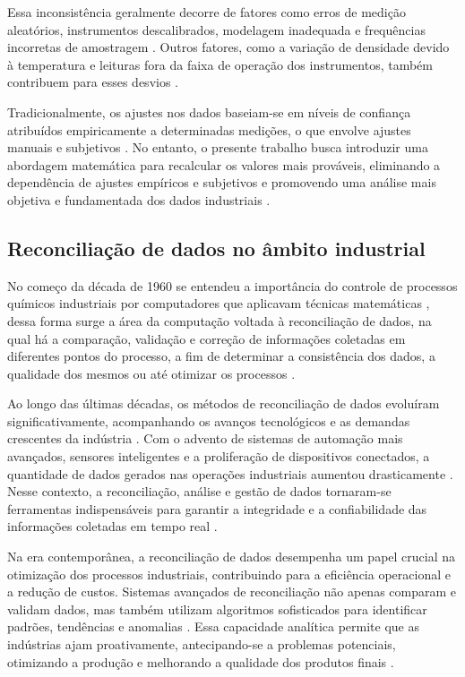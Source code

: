 Essa inconsistência geralmente decorre de fatores como erros de medição aleatórios, instrumentos descalibrados, modelagem inadequada e frequências incorretas de amostragem \cite{measurementerror2020}. Outros fatores, como a variação de densidade devido à temperatura e leituras fora da faixa de operação dos instrumentos, também contribuem para esses desvios \cite{temperaturedensity2022}.

Tradicionalmente, os ajustes nos dados baseiam-se em níveis de confiança atribuídos empiricamente a determinadas medições, o que envolve ajustes manuais e subjetivos \cite{empiricaladjustment2023}. No entanto, o presente trabalho busca introduzir uma abordagem matemática para recalcular os valores mais prováveis, eliminando a dependência de ajustes empíricos e subjetivos e promovendo uma análise mais objetiva e fundamentada dos dados industriais \cite{mathematicalapproach2024}.


\subsection{Reconciliação de dados no âmbito industrial}
    
No começo da década de 1960 se entendeu a importância do controle de processos químicos industriais por computadores que aplicavam técnicas matemáticas \cite{computecontrol}, dessa forma surge a área da computação voltada à reconciliação de dados, na qual há a comparação, validação e correção de informações coletadas em diferentes pontos do processo, a fim de determinar a consistência dos dados, a qualidade dos mesmos ou até otimizar os processos \cite{datarecshakar}.
    
Ao longo das últimas décadas, os métodos de reconciliação de dados evoluíram significativamente, acompanhando os avanços tecnológicos e as demandas crescentes da indústria \cite{datarecsurvey}. Com o advento de sistemas de automação mais avançados, sensores inteligentes e a proliferação de dispositivos conectados, a quantidade de dados gerados nas operações industriais aumentou drasticamente \cite{datarecsurvey}. Nesse contexto, a reconciliação, análise e gestão de dados tornaram-se ferramentas indispensáveis para garantir a integridade e a confiabilidade das informações coletadas em tempo real \cite{aularecon}.
    
Na era contemporânea, a reconciliação de dados desempenha um papel crucial na otimização dos processos industriais, contribuindo para a eficiência operacional e a redução de custos. Sistemas avançados de reconciliação não apenas comparam e validam dados, mas também utilizam algoritmos sofisticados para identificar padrões, tendências e anomalias \cite{datarecragnoli}. Essa capacidade analítica permite que as indústrias ajam proativamente, antecipando-se a problemas potenciais, otimizando a produção e melhorando a qualidade dos produtos finais \cite{datarecshakar}.


